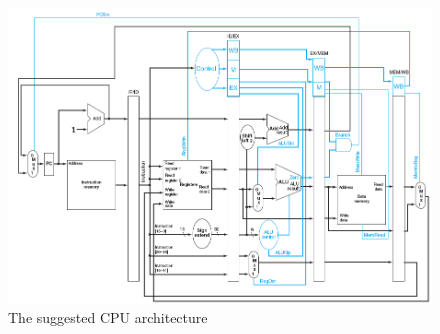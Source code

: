 
\begin{figure}[ht]
    \centering
    \includegraphics[scale=0.62]{figures/SuggestedArchitecture.png}
    \caption{\label{fig:suggestedArchitecture}The suggested CPU architecture} 
\end{figure}


